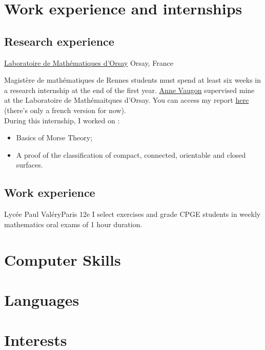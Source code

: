 \documentclass[11pt,letterpaper,sans]{moderncv}
\begin{document}
\section{Work experience and internships}

\subsection{Research experience}
{\href{https://www.imo.universite-paris-saclay.fr/fr/}{Laboratoire de Mathématiques d'Orsay}}
{Orsay, France}{}{
	Magistère de mathématiques de Rennes students must spend at least six weeks in a research internship 
	at the end of the first year. \href{https://anne.vaugon.vwx.fr/}{Anne Vaugon} supervised mine at the 
	Laboratoire de Mathémaitques d'Orsay. 
	You can access my report \color{newred} 
	\href{https://perso.eleves.ens-rennes.fr/people/amar.ahmane/src/rapports/stage-l3.pdf}{here} 
	\color{black} (there's only a french version for now).\\
	During this internship, I worked on : 
	\begin{itemize}
		\item Basics of Morse Theory; 
		\item A proof of the classification of compact, connected, orientable and closed
		surfaces.\\
		\vspace{1em} 
		\begin{center}
			
		\end{center}
	\end{itemize}
}

\subsection{Work experience}
{Lycée Paul Valéry}{Paris 12e}{}{
	I select exercises and grade CPGE students in weekly mathematics oral exams
	of 1 hour duration. 
}


\section{Computer Skills}

\section{Languages}

\section{Interests}
\end{document}
